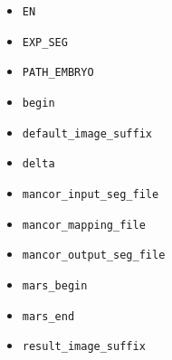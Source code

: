 \begin{itemize}
\itemsep -1ex
\item \texttt{EN}
\item \texttt{EXP\_SEG}
\item \texttt{PATH\_EMBRYO}
\item \texttt{begin}
\item \texttt{default\_image\_suffix}
\item \texttt{delta}
\item \texttt{mancor\_input\_seg\_file}
\item \texttt{mancor\_mapping\_file}
\item \texttt{mancor\_output\_seg\_file}
\item \texttt{mars\_begin}
\item \texttt{mars\_end}
\item \texttt{result\_image\_suffix}
\end{itemize}